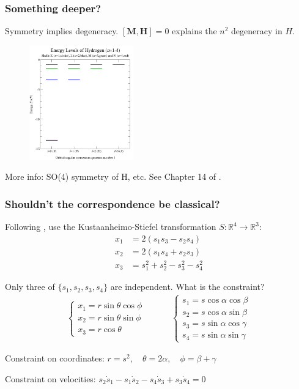\documentclass{beamer}
\theoremstyle{definition}
\newcommand{\be}{\beta}
\begin{document}
\begin{frame}
\frametitle{Something deeper?}

Symmetry implies degeneracy. $[\mathbf{M}, \mathbf{H}] = 0 $ explains the $n^2$ degeneracy in $H$. 

\begin{figure}[!htb]
\centering
\includegraphics[width=0.4\textwidth]{figures/Hydrogen_energy_levels.png}
\end{figure}

More info: SO(4) symmetry of H, etc. See Chapter 14 of \cite{gilmore2008lie}. 






\end{frame}






\begin{frame}
\frametitle{Shouldn't the correspondence be classical?}


Following \cite{chen1987coulomb}, use the Kustaanheimo-Stiefel transformation $S: \mathbb{R}^4\to \mathbb{R}^3$:
\begin{align*}
x_1 &= 2(s_1s_3 - s_2s_4) \\
x_2 &= 2(s_1s_4+s_2s_3) \\ 
x_3 &= s_1^2 + s_2^2 - s_3^2 - s_4^2
\end{align*}

\pause 

Only three of $\{ s_1,s_2,s_3,s_4 \}$ are independent. What is the constraint?
\begin{align*}
\begin{cases*}
x_1 = r \sin\theta\cos \phi \\ 
x_2 = r \sin\theta\sin \phi \\ 
x_3 = r\cos\theta
\end{cases*}
\quad\quad\quad 
\begin{cases*}
s_1 = s\cos\alpha \cos\beta \\ 
s_2 = s\cos\alpha \sin\beta \\
s_3 = s\sin\alpha \cos\gamma \\ 
s_4 = s\sin\alpha \sin\gamma
\end{cases*}
\end{align*}

\pause 
Constraint on coordinates: $r = s^2,\quad  \theta = 2 \alpha, \quad \phi = \be + \gamma$

\pause 
Constraint on velocities: $s_2\dot{s}_1 - s_1 \dot{s}_2 - s_4 \dot{s}_3 + s_3 \dot{s}_4 = 0$

\end{frame}
\end{document}
